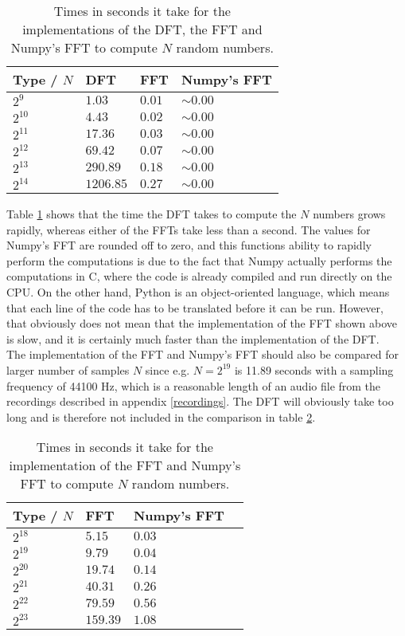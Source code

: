 \begin{table}[H]
\centering
\begin{tabular}{|l|l|l|l|}
\hline
Type / $N$ & DFT	   & FFT 	 & Numpy's FFT \\ \hline
$2^9$  	   & $1.03$    & $0.01$  & $\sim 0.00$ \\ \hline
$2^{10}$   & $4.43$    & $0.02$  & $\sim 0.00$ \\ \hline
$2^{11}$   & $17.36$   & $0.03$  & $\sim 0.00$ \\ \hline
$2^{12}$   & $69.42$   & $0.07$  & $\sim 0.00$ \\ \hline
$2^{13}$   & $290.89$  & $0.18$  & $\sim 0.00$ \\ \hline
$2^{14}$   & $1206.85$ & $0.27$  & $\sim 0.00$ \\ \hline
\end{tabular}
\caption{Times in seconds it take for the implementations of the DFT, the FFT and Numpy's FFT to compute $N$ random numbers.}
\label{tab:FTcompare}
\end{table}

Table \ref{tab:FTcompare} shows that the time the DFT takes to compute the $N$ numbers grows rapidly, whereas either of the FFTs take less than a second. The values for Numpy's FFT are rounded off to zero, and this functions ability to rapidly perform the computations is due to the fact that Numpy actually performs the computations in C, where the code is already compiled and run directly on the CPU. On the other hand, Python is an object-oriented language, which means that each line of the code has to be translated before it can be run. However, that obviously does not mean that the implementation of the FFT shown above is slow, and it is certainly much faster than the implementation of the DFT. \\
The implementation of the FFT and Numpy's FFT should also be compared for larger number of samples $N$ since e.g. $N = 2^{19}$ is 11.89 seconds with a sampling frequency of 44100 Hz, which is a reasonable length of an audio file from the recordings described in appendix \ref{recordings}. The DFT will obviously take too long and is therefore not included in the comparison in table \ref{tab:FT2compare}.

\begin{table}[H]
\centering
\begin{tabular}{|l|l|l|l|}
\hline
Type / $N$ & FFT	   & Numpy's FFT \\ \hline
$2^{18}$   & $5.15$    & $0.03$ \\ \hline
$2^{19}$   & $9.79$    & $0.04$ \\ \hline
$2^{20}$   & $19.74$   & $0.14$ \\ \hline
$2^{21}$   & $40.31$   & $0.26$ \\ \hline
$2^{22}$   & $79.59$   & $0.56$ \\ \hline
$2^{23}$   & $159.39$  & $1.08$ \\ \hline
\end{tabular}
\caption{Times in seconds it take for the implementation of the FFT and Numpy's FFT to compute $N$ random numbers.}
\label{tab:FT2compare}
\end{table}

